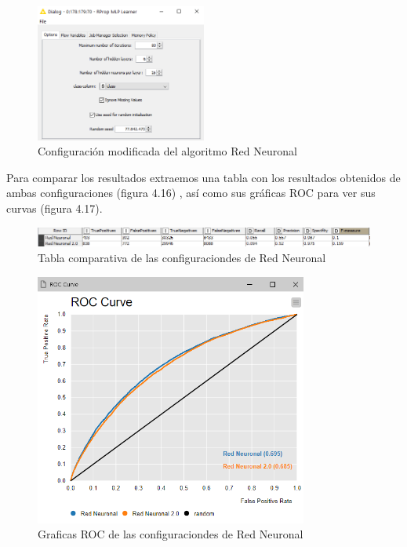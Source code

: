 	\begin{figure}[htb]
		\centering
		\includegraphics[width=0.5\textwidth]{./imagenes/57}
		\caption{Configuración modificada del algoritmo Red Neuronal} \label{fig:1}
	\end{figure}
	
	Para comparar los resultados extraemos una tabla con los resultados obtenidos de ambas configuraciones (figura 4.16) , así como sus gráficas ROC para ver sus curvas (figura 4.17). \\
	
	\begin{figure}[htb]
		\centering
		\includegraphics[width=1.0\textwidth]{./imagenes/55}
		\caption{Tabla comparativa de las configuraciondes de Red Neuronal} \label{fig:1}
	\end{figure}
	
	\begin{figure}[htb]
		\centering
		\includegraphics[width=0.8\textwidth]{./imagenes/56}
		\caption{Graficas ROC de las configuraciondes de Red Neuronal} \label{fig:1}
	\end{figure}
	
